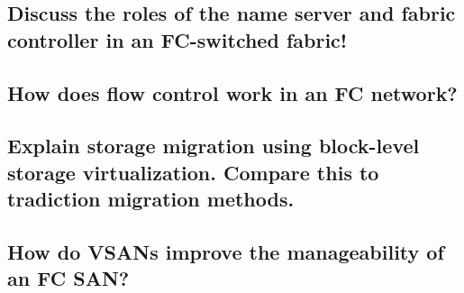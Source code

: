 
\subsection{Discuss the roles of the name server and fabric controller in an FC-switched fabric!} %
\label{sub:discuss_the_roles_of_the_name_server_and_fabric_controller_in_an_fc_switched_fabric}


\subsection{How does flow control work in an FC network?} %
\label{sub:how_does_flow_control_work_in_an_fc_network}


\subsection{Explain storage migration using block-level storage virtualization. Compare this to tradiction migration methods.} %
\label{sub:explain_storage_migration_using_block_level_storage_virtualization_compare_this_to_tradiction_migration_methods_}


\subsection{How do VSANs improve the manageability of an FC SAN?} %
\label{sub:how_do_vsans_improve_the_manageability_of_an_fc_san}


